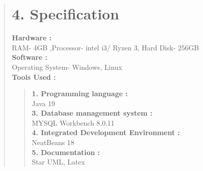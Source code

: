 \documentclass[12pt]{report}
\begin{document}
	
	\begin{quote}
		\section{4. Specification}
		\textbf{Hardware : }\\
		RAM- 4GB ,Processor- intel i3/ Ryzen 3, Hard Disk- 256GB\\
		\vspace{0.3cm}
		\textbf{Software : }\\
		Operating System- Windows, Linux\\
		\vspace{0.3cm}
		\textbf{Tools Used : }\\
		\begin{quote}
			\textbf{1. Programming language :}\\Java 19\\
			\vspace{0.2cm}
			\textbf{3. Database management system :}\\MYSQL Workbench 8.0.11\\
			\vspace{0.2cm}
			\textbf{4. Integrated Development Environment :}\\ NeatBeans 18\\
			\vspace{0.2cm}
			\textbf{5. Documentation :}\\Star UML, Latex\\
		\end{quote}
	\end{quote}
	\clearpage
	
	\clearpage
	
\end{document}
